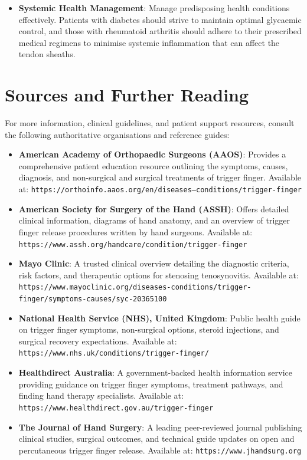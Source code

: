 \begin{itemize}
\begin{itemize}
    \item Use warm water soaks or a heating pad in the morning to relax stiff tendons and improve mobility before starting daily activities.
    \item Rest the hand and consider wearing a temporary, over-the-counter finger splint at night to prevent the finger from curling into a fist during sleep.
  \end{itemize}
  \item \textbf{Systemic Health Management}:
  Manage predisposing health conditions effectively. Patients with diabetes should strive to maintain optimal glycaemic control, and those with rheumatoid arthritis should adhere to their prescribed medical regimens to minimise systemic inflammation that can affect the tendon sheaths.
\end{itemize}

\section*{Sources and Further Reading}
For more information, clinical guidelines, and patient support resources, consult the following authoritative organisations and reference guides:

\begin{itemize}
  \item \textbf{American Academy of Orthopaedic Surgeons (AAOS)}: Provides a comprehensive patient education resource outlining the symptoms, causes, diagnosis, and non-surgical and surgical treatments of trigger finger. Available at: \texttt{https://orthoinfo.aaos.org/en/diseases--conditions/trigger-finger}
  \item \textbf{American Society for Surgery of the Hand (ASSH)}: Offers detailed clinical information, diagrams of hand anatomy, and an overview of trigger finger release procedures written by hand surgeons. Available at: \texttt{https://www.assh.org/handcare/condition/trigger-finger}
  \item \textbf{Mayo Clinic}: A trusted clinical overview detailing the diagnostic criteria, risk factors, and therapeutic options for stenosing tenosynovitis. Available at: \texttt{https://www.mayoclinic.org/diseases-conditions/trigger-finger/symptoms-causes/syc-20365100}
  \item \textbf{National Health Service (NHS), United Kingdom}: Public health guide on trigger finger symptoms, non-surgical options, steroid injections, and surgical recovery expectations. Available at: \texttt{https://www.nhs.uk/conditions/trigger-finger/}
  \item \textbf{Healthdirect Australia}: A government-backed health information service providing guidance on trigger finger symptoms, treatment pathways, and finding hand therapy specialists. Available at: \texttt{https://www.healthdirect.gov.au/trigger-finger}
  \item \textbf{The Journal of Hand Surgery}: A leading peer-reviewed journal publishing clinical studies, surgical outcomes, and technical guide updates on open and percutaneous trigger finger release. Available at: \texttt{https://www.jhandsurg.org}
\end{itemize}